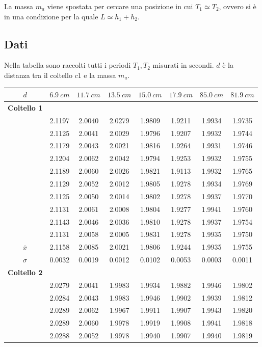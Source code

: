 La massa $m_a$ viene spostata per cercare una posizione in cui $T_1 \simeq T_2$, ovvero si è in una condizione per la quale $L\simeq h_1+h_2$. 

\subsection{Dati}
Nella tabella sono raccolti tutti i periodi $T_1,T_2$ misurati in secondi. $d$ è la distanza tra il coltello $c1$ e la massa $m_a$.
\begin{center}
\begin{tabular}{*{8}{c}}
$d$& $6.9\ cm$ & $11.7\ cm$ & $13.5\ cm$  & $15.0\ cm$ & $17.9\ cm$ & $85.0\ cm$ & $81.9\ cm$ \\
\midrule
 \textbf{Coltello 1}&& & & & & \\
&2.1197 &2.0040&2.0279 &1.9809 & 1.9211 & 1.9934 & 1.9735\\
 &2.1125&2.0041 &2.0029&1.9796 & 1.9207 & 1.9932 & 1.9744 \\
 &2.1179&2.0043 &2.0021&1.9816 & 1.9264 & 1.9931 & 1.9746 \\
 &2.1204&2.0062 &2.0042&1.9794 & 1.9253 & 1.9932 & 1.9755 \\
 &2.1189&2.0060 &2.0026&1.9821 & 1.9113 & 1.9932 & 1.9765 \\
 &2.1129&2.0052&2.0012&1.9805 & 1.9278 & 1.9934 & 1.9769 \\
&2.1125 &2.0050&2.0014&1.9802 & 1.9278 & 1.9937 & 1.9770 \\
&2.1131 &2.0061&2.0008&1.9804 & 1.9277 & 1.9941 & 1.9760 \\
 &2.1143&2.0046&2.0036&1.9810 & 1.9278 & 1.9937 & 1.9754 \\
 &2.1131&2.0058&2.0005& 1.9831 & 1.9278 & 1.9935 & 1.9750 \\
 \midrule
$\bar{x}$& 2.1158 & 2.0085 & 2.0021 & 1.9806 & 1.9244 & 1.9935 & 1.9755\\
$\sigma$ & 0.0032 & 0.0019 & 0.0012 & 0.0102 & 0.0053 & 0.0003 & 0.0011\\
\midrule
\textbf{Coltello 2} && & & & & \\
&2.0279&2.0041&1.9983 &1.9934 & 1.9882 & 1.9946 &	1.9802 \\
&2.0284&2.0043&1.9983 &1.9946 & 1.9902 & 1.9939 &	1.9812 \\
&2.0289&2.0062&1.9967 &1.9911 & 1.9907 & 1.9943 &	1.9820 \\
&2.0289&2.0060&1.9978 &1.9919 & 1.9908 & 1.9941 &	1.9818 \\
&2.0288&2.0052&1.9978 &1.9940 & 1.9907 & 1.9940 &	1.9819 \\

\end{tabular}
\end{center}

